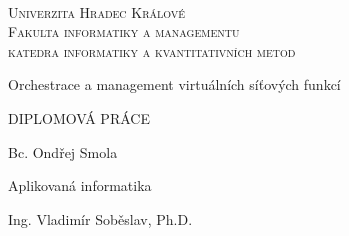 \documentclass[12pt,a4paper,czech,czech,openright,cleardoubleempty,BCOR10mm,DIV11]{scrreprt}
\newcommand{\noun}[1]{\textsc{#1}}
\begin{document}
\cleardoublepage{}~\thispagestyle{empty}\begin{center}\vspace{10mm}


\textsf{\textsc{\noun{\LARGE Univerzita Hradec Králové}}}\\
\vspace{0.5em}
\textsc{\noun{\LARGE Fakulta informatiky a managementu}}\\
\vspace*{1em}
\textsf{\textsc{\noun{\Large katedra informatiky a kvantitativních metod }}}

\vspace{15mm}


\vspace{15mm}

\textsf{\LARGE Orchestrace a management virtuálních síťových funkcí}{\LARGE \par}


\vspace{15mm}

\textsf{\LARGE DIPLOMOVÁ PRÁCE}{\LARGE \par}

\vspace{10mm}


\end{center} 

\vspace*{\fill}


\vspace{10mm}

\begin{description}
\item [{{\large Autor:}}] \noindent \textsf{\large Bc. Ondřej Smola}{\large \par}
\item [{{\large Studijní obor:}}] \noindent \textsf{\large Aplikovaná informatika}{\large \par}
\item [{{\large Vedoucí~práce:}}] \noindent \textsf{\large Ing. Vladimír Soběslav, Ph.D.}{\large{}
\item {}
}{\large \par}
\end{description}
\clearpage{}

\end{document}
